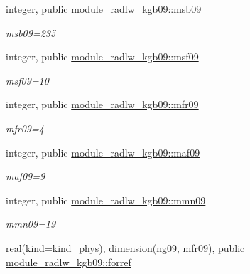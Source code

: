 \begin{DoxyCompactItemize}
integer, public \hyperlink{group__module__radlw__kgbnn_ga7e6bb7acb0df29586d0bd52f3fc41d90}{module\+\_\+radlw\+\_\+kgb09\+::msb09}
\begin{DoxyCompactList}\small\item\em msb09=235 \end{DoxyCompactList}\item 
\mbox{\label{group__module__radlw__kgbnn_ga7d728ef04b3f26c6b20149084334be5a}} 
integer, public \hyperlink{group__module__radlw__kgbnn_ga7d728ef04b3f26c6b20149084334be5a}{module\+\_\+radlw\+\_\+kgb09\+::msf09}
\begin{DoxyCompactList}\small\item\em msf09=10 \end{DoxyCompactList}\item 
\mbox{\label{group__module__radlw__kgbnn_ga777f63022c4f7187446945c6e6ba77e7}} 
integer, public \hyperlink{group__module__radlw__kgbnn_ga777f63022c4f7187446945c6e6ba77e7}{module\+\_\+radlw\+\_\+kgb09\+::mfr09}
\begin{DoxyCompactList}\small\item\em mfr09=4 \end{DoxyCompactList}\item 
\mbox{\label{group__module__radlw__kgbnn_ga7d5d565c87af7ef07dc17930f9cb9e57}} 
integer, public \hyperlink{group__module__radlw__kgbnn_ga7d5d565c87af7ef07dc17930f9cb9e57}{module\+\_\+radlw\+\_\+kgb09\+::maf09}
\begin{DoxyCompactList}\small\item\em maf09=9 \end{DoxyCompactList}\item 
\mbox{\label{group__module__radlw__kgbnn_gaa9c8294b56ac3ce90b07114e986777a9}} 
integer, public \hyperlink{group__module__radlw__kgbnn_gaa9c8294b56ac3ce90b07114e986777a9}{module\+\_\+radlw\+\_\+kgb09\+::mmn09}
\begin{DoxyCompactList}\small\item\em mmn09=19 \end{DoxyCompactList}\item 
\mbox{\label{group__module__radlw__kgbnn_ga72a8c0879636dba20e2a8a35ba79f681}} 
real(kind=kind\+\_\+phys), dimension(ng09, \hyperlink{group__module__radlw__kgbnn_ga777f63022c4f7187446945c6e6ba77e7}{mfr09}), public \hyperlink{group__module__radlw__kgbnn_ga72a8c0879636dba20e2a8a35ba79f681}{module\+\_\+radlw\+\_\+kgb09\+::forref}

\end{DoxyCompactItemize}
